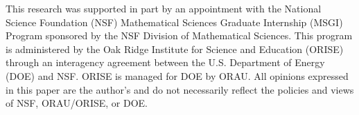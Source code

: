 \documentclass{siamonline220329}
\begin{document}
This research was supported in part by an appointment with the
National Science Foundation (NSF) Mathematical Sciences Graduate
Internship (MSGI) Program sponsored by the NSF Division of
Mathematical Sciences. This program is administered by the Oak Ridge
Institute for Science and Education (ORISE) through an interagency
agreement between the U.S. Department of Energy (DOE) and NSF. ORISE
is managed for DOE by ORAU. All opinions expressed in this paper are
the author's and do not necessarily reflect the policies and views of
NSF, ORAU/ORISE, or DOE.




\end{document}
